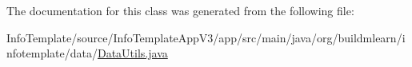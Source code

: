 The documentation for this class was generated from the following file\+:\begin{DoxyCompactItemize}
\item 
Info\+Template/source/\+Info\+Template\+App\+V3/app/src/main/java/org/buildmlearn/infotemplate/data/\hyperlink{InfoTemplate_2source_2InfoTemplateAppV3_2app_2src_2main_2java_2org_2buildmlearn_2infotemplate_2data_2DataUtils_8java}{Data\+Utils.\+java}\end{DoxyCompactItemize}
